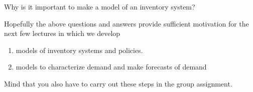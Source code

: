 \begin{exercise}
  Why is it important to make a model of an inventory system?

\end{exercise}

Hopefully the above questions and answers provide sufficient
motivation for the next few lectures in which we develop
\begin{enumerate}
 \item models of inventory systems  and policies. 
 \item models to characterize demand and make forecasts of demand
\end{enumerate}
Mind that you also have to carry out these steps in the group
assignment.


